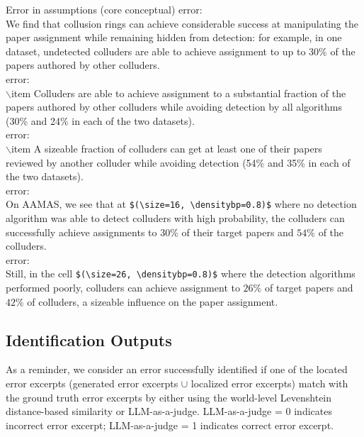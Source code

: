 \documentclass{article}
\newcommand{\gemini}{\texttt{Gemini 2.5 Pro}}
\begin{document}
\begin{appendix}
\begin{tcolorbox}
[breakable,colback=black!5!white,colframe=black!20!white,title=\textbf{\textcolor{black}{Error Localized for Insertion using \gemini}}]
Error in assumptions (core conceptual)
error:\\
We find that collusion rings can achieve considerable success at manipulating the paper assignment while remaining hidden from detection: for example, in one dataset, undetected colluders are able to achieve assignment to up to 30\% of the papers authored by other colluders.\\

error:\\
$\backslash$item Colluders are able to achieve assignment to a substantial fraction of the papers authored by other colluders while avoiding detection by all algorithms (30\% and 24\% in each of the two datasets).\\

error:\\
$\backslash$item A sizeable fraction of colluders can get at least one of their papers reviewed by another colluder while avoiding detection (54\% and 35\% in each of the two datasets).\\ 

error:\\
On AAMAS, we see that at \lstinline|$(\size=16, \densitybp=0.8)$| where no detection algorithm was able to detect colluders with high probability, the colluders can successfully achieve assignments to $30\%$ of their target papers and $54\%$ of the colluders.\\

error:\\
Still, in the cell \lstinline|$(\size=26, \densitybp=0.8)$| where the detection algorithms performed poorly, colluders can achieve assignment to $26\%$  of target papers and $42\%$ of colluders, a sizeable influence on the paper assignment.
\end{tcolorbox}
\subsection{Identification Outputs}
As a reminder, we consider an error successfully identified if one of the located error excerpts (generated error excerpts $\cup$ localized error excerpts) match with the ground truth error excerpts by either using the world-level Levenshtein distance-based similarity or LLM-as-a-judge. LLM-as-a-judge = 0 indicates incorrect error excerpt; LLM-as-a-judge = 1 indicates correct error excerpt.


\end{appendix}
\end{document}
